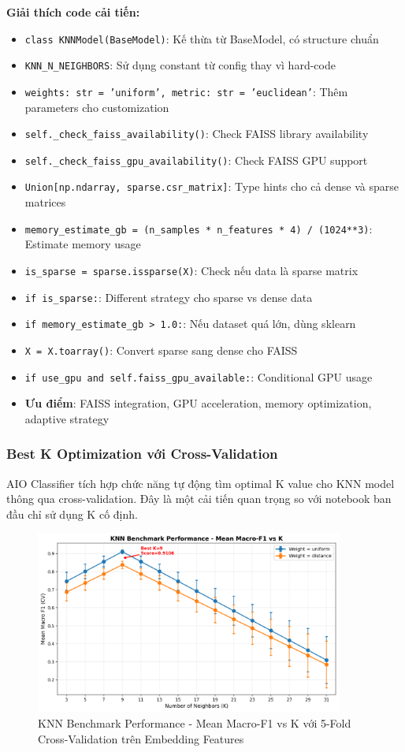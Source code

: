 \textbf{Giải thích code cải tiến:}
\begin{itemize}
    \item \texttt{class KNNModel(BaseModel)}: Kế thừa từ BaseModel, có structure chuẩn
    \item \texttt{KNN\_N\_NEIGHBORS}: Sử dụng constant từ config thay vì hard-code
    \item \texttt{weights: str = 'uniform', metric: str = 'euclidean'}: Thêm parameters cho customization
    \item \texttt{self.\_check\_faiss\_availability()}: Check FAISS library availability
    \item \texttt{self.\_check\_faiss\_gpu\_availability()}: Check FAISS GPU support
    \item \texttt{Union[np.ndarray, sparse.csr\_matrix]}: Type hints cho cả dense và sparse matrices
    \item \texttt{memory\_estimate\_gb = (n\_samples * n\_features * 4) / (1024**3)}: Estimate memory usage
    \item \texttt{is\_sparse = sparse.issparse(X)}: Check nếu data là sparse matrix
    \item \texttt{if is\_sparse:}: Different strategy cho sparse vs dense data
    \item \texttt{if memory\_estimate\_gb > 1.0:}: Nếu dataset quá lớn, dùng sklearn
    \item \texttt{X = X.toarray()}: Convert sparse sang dense cho FAISS
    \item \texttt{if use\_gpu and self.faiss\_gpu\_available:}: Conditional GPU usage
    \item \textbf{Ưu điểm}: FAISS integration, GPU acceleration, memory optimization, adaptive strategy
\end{itemize}

\subsubsection{Best K Optimization với Cross-Validation}

AIO Classifier tích hợp chức năng tự động tìm optimal K value cho KNN model thông qua cross-validation. Đây là một cải tiến quan trọng so với notebook ban đầu chỉ sử dụng K cố định.

\begin{figure}[H]
\centering
\includegraphics[width=0.9\textwidth]{image/Best K.png}
\caption{KNN Benchmark Performance - Mean Macro-F1 vs K với 5-Fold Cross-Validation trên Embedding Features}
\label{fig:knn_benchmark}
\end{figure}

